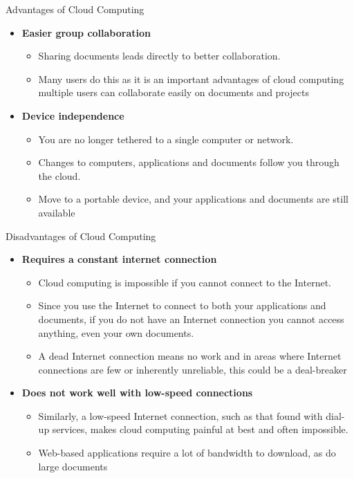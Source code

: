 \documentclass{SKP-beamer}
\begin{document}
\begin{frame}{Advantages of Cloud Computing}
	\begin{itemize}
		
		\item  \textbf{Easier group collaboration}
		\begin{itemize}
			\item  Sharing documents leads directly to better collaboration.
			\item  Many users do this as it is an important advantages of cloud computing
			multiple users can collaborate easily on documents and projects
			
		\end{itemize}
		\item  \textbf{Device independence}
		\begin{itemize}
			\item  You are no longer tethered to a single computer or network.
			\item  Changes to computers, applications and documents follow you through the
			cloud.
			\item  Move to a portable device, and your applications and documents are still 
			available
			
		\end{itemize}
	\end{itemize}
\end{frame}

\begin{frame}{Disadvantages of Cloud Computing}
	\begin{itemize}
		
		\item  \textbf{Requires a constant internet connection}
		\begin{itemize}
		\item  Cloud computing is impossible if you cannot connect to the Internet.
		\item  Since you use the Internet to connect to both your applications and documents, if you do not 
		have an Internet connection you cannot access anything, even your own documents.
		\item  A dead Internet connection means no work and in areas where Internet connections are few or 
		inherently unreliable, this could be a deal-breaker
			
		\end{itemize}
		\item  \textbf{Does not work well with low-speed connections}
		\begin{itemize}
			\item  Similarly, a low-speed Internet connection, such as that found with dial-up services, makes 
			cloud computing painful at best and often impossible.
			\item  Web-based applications require a lot of bandwidth to download, as do large documents
			
		\end{itemize}
	\end{itemize}
\end{frame}
\end{document}
